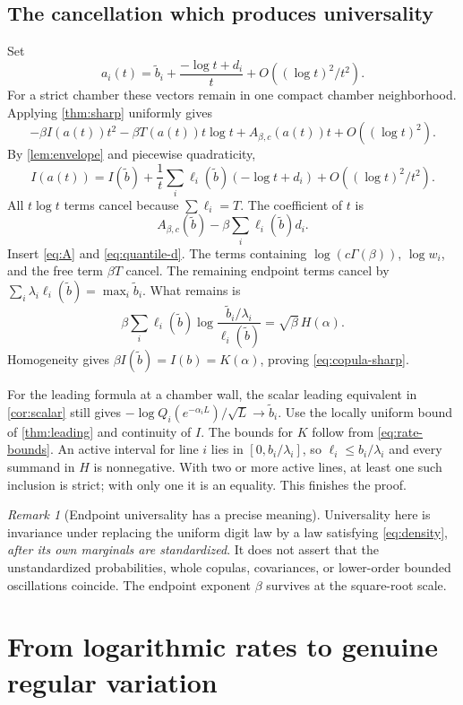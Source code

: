 \documentclass[11pt,a4paper]{article}
\theoremstyle{definition}
\theoremstyle{remark}
\newtheorem{remark}[theorem]{Remark}
\numberwithin{equation}{section}
\begin{document}
\subsection{The cancellation which produces universality}
Set
\[
 a_i(t)=\widetilde b_i+\frac{-\log t+d_i}{t}
                    +O((\log t)^2/t^2).
\]
For a strict chamber these vectors remain in one compact chamber
neighborhood. Applying \cref{thm:sharp} uniformly gives
\[
 -\beta I(a(t))t^2-\beta T(a(t))t\log t+A_{\beta,c}(a(t))t
 +O((\log t)^2).
\]
By \cref{lem:envelope} and piecewise quadraticity,
\[
 I(a(t))=I(\widetilde b)+\frac1t
 \sum_i\ell_i(\widetilde b)(-\log t+d_i)
 +O((\log t)^2/t^2).
\]
All $t\log t$ terms cancel because $\sum\ell_i=T$. The coefficient of
$t$ is
\[
 A_{\beta,c}(\widetilde b)-\beta\sum_i\ell_i(\widetilde b)d_i.
\]
Insert \eqref{eq:A} and \eqref{eq:quantile-d}. The terms containing
$\log(c\Gamma(\beta))$, $\log w_i$, and the free term $\beta T$
cancel. The remaining endpoint terms cancel by
$\sum_i\lambda_i\ell_i(\widetilde b)=\max_i\widetilde b_i$. What remains is
\[
 \beta\sum_i\ell_i(\widetilde b)
      \log\frac{\widetilde b_i/\lambda_i}{\ell_i(\widetilde b)}
 =\sqrt\beta\,H(\alpha).
\]
Homogeneity gives $\beta I(\widetilde b)=I(b)=K(\alpha)$, proving
\eqref{eq:copula-sharp}.

For the leading formula at a chamber wall, the scalar leading equivalent
in \cref{cor:scalar} still gives
$-\log Q_i(e^{-\alpha_iL})/\sqrt L\to\widetilde b_i$.
Use the locally uniform bound of \cref{thm:leading} and continuity of $I$.
The bounds for $K$ follow from \eqref{eq:rate-bounds}. An active interval
for line $i$ lies in $[0,b_i/\lambda_i]$, so
$\ell_i\le b_i/\lambda_i$ and every summand in $H$ is nonnegative.
With two or more active lines, at least one such inclusion is strict; with
only one it is an equality. This finishes the proof.

\begin{remark}[Endpoint universality has a precise meaning]
Universality here is invariance under replacing the uniform digit law by a
law satisfying \eqref{eq:density}, \emph{after its own marginals are
standardized}. It does not assert that the unstandardized probabilities,
whole copulas, covariances, or lower-order bounded oscillations coincide.
The endpoint exponent $\beta$ survives at the square-root scale.
\end{remark}

\section{From logarithmic rates to genuine regular variation}
\label{sec:RV}
\end{document}
